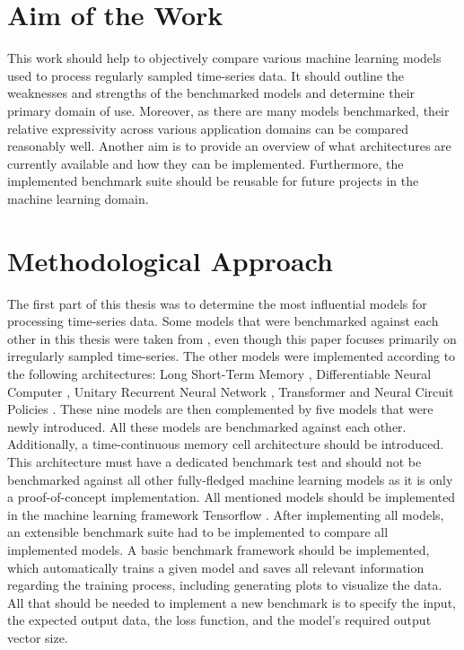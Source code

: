 \documentclass[draft,final]{vutinfth} %
\begin{document}
\section{Aim of the Work}
This work should help to objectively compare various machine learning models used to process regularly sampled time-series data.
It should outline the weaknesses and strengths of the benchmarked models and determine their primary domain of use.
Moreover, as there are many models benchmarked, their relative expressivity across various application domains can be compared reasonably well.
Another aim is to provide an overview of what architectures are currently available and how they can be implemented.
Furthermore, the implemented benchmark suite should be reusable for future projects in the machine learning domain.


\section{Methodological Approach}
The first part of this thesis was to determine the most influential models for processing time-series data.
Some models that were benchmarked against each other in this thesis were taken from \cite{ODELSTM}, even though this paper focuses primarily on irregularly sampled time-series.
The other models were implemented according to the following architectures: Long Short-Term Memory \cite{LSTM}, Differentiable Neural Computer \cite{DNC}, Unitary Recurrent Neural Network \cite{EfficientUnitaryRNNs}, Transformer \cite{Transformer} and Neural Circuit Policies \cite{NCP}.
These nine models are then complemented by five models that were newly introduced.
All these models are benchmarked against each other.
Additionally, a time-continuous memory cell architecture should be introduced.
This architecture must have a dedicated benchmark test and should not be benchmarked against all other fully-fledged machine learning models as it is only a proof-of-concept implementation.
All mentioned models should be implemented in the machine learning framework Tensorflow \cite{Tensorflow}.
After implementing all models, an extensible benchmark suite had to be implemented to compare all implemented models.
A basic benchmark framework should be implemented, which automatically trains a given model and saves all relevant information regarding the training process, including generating plots to visualize the data.
All that should be needed to implement a new benchmark is to specify the input, the expected output data, the loss function, and the model's required output vector size.
\end{document}
